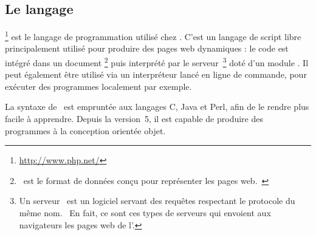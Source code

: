 \subsection{Le langage \aphp}

\aphp\footnote{\url{http://www.php.net/}} est le langage de programmation utilisé chez \asl. C'est un langage de script libre principalement utilisé pour produire des pages web dynamiques : le code est intégré dans un document \ahtml\footnote{\ahtml\ est le format de données conçu pour représenter les pages web.~\cite{html}} puis interprété par le serveur~\ahttp\footnote{Un serveur \ahttp\ est un logiciel servant des requêtes respectant le protocole du même nom.~\cite{serveurhttp} En fait, ce sont ces types de serveurs qui envoient aux navigateurs les pages web de l'\ainternet.} doté d'un module \aphp. Il peut également être utilisé via un interpréteur lancé en ligne de commande, pour exécuter des programmes localement par exemple.

La syntaxe de \aphp\ est empruntée aux langages C, Java et Perl, afin de le rendre plus facile à apprendre. Depuis la version~5, il est capable de produire des programmes à la conception orientée objet.
